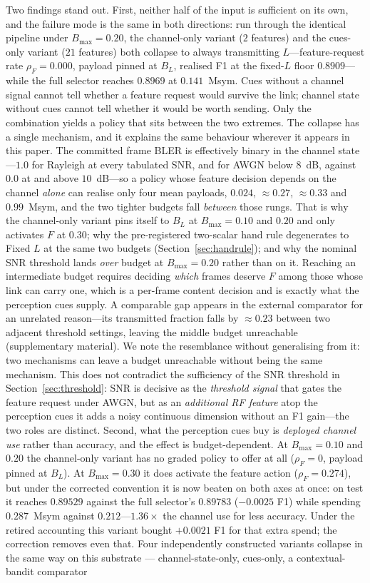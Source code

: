 \documentclass[journal]{IEEEtran}
\begin{document}
Two findings stand out. First, neither half of the input is sufficient on its own, and the failure mode is the same in both directions: run through the identical pipeline under $B_{\max}=0.20$, the channel-only variant ($2$ features) and the cues-only variant ($21$ features) both collapse to always transmitting $L$---feature-request rate $\rho_F=0.000$, payload pinned at $B_L$, realised F1 at the fixed-$L$ floor $0.8909$---while the full selector reaches $0.8969$ at $0.141$~Msym. Cues without a channel signal cannot tell whether a feature request would survive the link; channel state without cues cannot tell whether it would be worth sending. Only the combination yields a policy that sits between the two extremes. The collapse has a single mechanism, and it explains the same behaviour wherever it appears in this paper. The committed frame BLER is effectively binary in the channel state---$1.0$ for Rayleigh at every tabulated SNR, and for AWGN below $8$~dB, against $0.0$ at and above $10$~dB---so a policy whose feature decision depends on the channel \emph{alone} can realise only four mean payloads, $0.024$, ${\approx}0.27$, ${\approx}0.33$ and $0.99$~Msym, and the two tighter budgets fall \emph{between} those rungs. That is why the channel-only variant pins itself to $B_L$ at $B_{\max}=0.10$ and $0.20$ and only activates $F$ at $0.30$; why the pre-registered two-scalar hand rule degenerates to Fixed $L$ at the same two budgets (Section~\ref{sec:handrule}); and why the nominal SNR threshold lands \emph{over} budget at $B_{\max}=0.20$ rather than on it. Reaching an intermediate budget requires deciding \emph{which} frames deserve $F$ among those whose link can carry one, which is a per-frame content decision and is exactly what the perception cues supply. A comparable gap appears in the external comparator for an unrelated reason---its transmitted fraction falls by ${\approx}0.23$ between two adjacent threshold settings, leaving the middle budget unreachable (supplementary material). We note the resemblance without generalising from it: two mechanisms can leave a budget unreachable without being the same mechanism. This does not contradict the sufficiency of the SNR threshold in Section~\ref{sec:threshold}: SNR is decisive as the \emph{threshold signal} that gates the feature request under AWGN, but as an \emph{additional RF feature} atop the perception cues it adds a noisy continuous dimension without an F1 gain---the two roles are distinct. Second, what the perception cues buy is \emph{deployed channel use} rather than accuracy, and the effect is budget-dependent. At $B_{\max}=0.10$ and $0.20$ the channel-only variant has no graded policy to offer at all ($\rho_F=0$, payload pinned at $B_L$). At $B_{\max}=0.30$ it does activate the feature action ($\rho_F=0.274$), but under the corrected convention it is now beaten on both axes at once: on test it reaches $0.89529$ against the full selector's $0.89783$ ($-0.0025$ F1) while spending $0.287$~Msym against $0.212$---$1.36\times$ the channel use for less accuracy. Under the retired accounting this variant bought $+0.0021$ F1 for that extra spend; the correction removes even that. Four independently constructed variants collapse in the same way on this substrate --- channel-state-only, cues-only, a contextual-bandit comparator 
\end{document}
